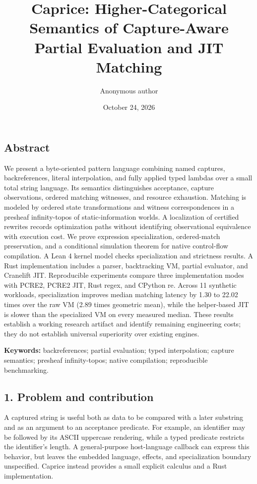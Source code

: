 \documentclass[
  11pt,
]{article}
\title{Caprice: Higher-Categorical Semantics of Capture-Aware Partial
Evaluation and JIT Matching}
\author{Anonymous author}
\date{October 24, 2026}
\begin{document}
\maketitle

\hypertarget{abstract}{%
\subsection{Abstract}\label{abstract}}

We present a byte-oriented pattern language combining named captures,
backreferences, literal interpolation, and fully applied typed lambdas
over a small total string language. Its semantics distinguishes
acceptance, capture observations, ordered matching witnesses, and
resource exhaustion. Matching is modeled by ordered state
transformations and witness correspondences in a presheaf infinity-topos
of static-information worlds. A localization of certified rewrites
records optimization paths without identifying observational equivalence
with execution cost. We prove expression specialization, ordered-match
preservation, and a conditional simulation theorem for native
control-flow compilation. A Lean 4 kernel model checks specialization
and strictness results. A Rust implementation includes a parser,
backtracking VM, partial evaluator, and Cranelift JIT. Reproducible
experiments compare three implementation modes with PCRE2, PCRE2 JIT,
Rust regex, and CPython re. Across 11 synthetic workloads,
specialization improves median matching latency by 1.30 to 22.02 times
over the raw VM (2.89 times geometric mean), while the helper-based JIT
is slower than the specialized VM on every measured median. These
results establish a working research artifact and identify remaining
engineering costs; they do not establish universal superiority over
existing engines.

\textbf{Keywords:} backreferences; partial evaluation; typed
interpolation; capture semantics; presheaf infinity-topos; native
compilation; reproducible benchmarking.

\hypertarget{problem-and-contribution}{%
\subsection{1. Problem and
contribution}\label{problem-and-contribution}}

A captured string is useful both as data to be compared with a later
substring and as an argument to an acceptance predicate. For example, an
identifier may be followed by its ASCII uppercase rendering, while a
typed predicate restricts the identifier's length. A general-purpose
host-language callback can express this behavior, but leaves the
embedded language, effects, and specialization boundary unspecified.
Caprice instead provides a small explicit calculus and a Rust
implementation.
\end{document}
